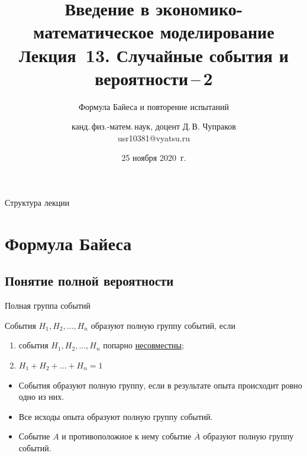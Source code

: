 \documentclass[unicode,11pt,notheorems,xcolor=table]{beamer}
\author[Д.\,В. Чупраков]{канд.\,физ.-матем.\,наук, доцент Д.\,В. Чупраков\\[6pt] usr10381@vyatsu.ru}
\institute[ВятГУ]{ФГБОУ ВО Вятский государственный университет}
\title[Лекция~13. Случайные события и вероятности]{
	Введение в экономико-математическое моделирование\\[12pt]
	Лекция~13. Случайные события и вероятности\,--\,2}
\subtitle{Формула Байеса и повторение испытаний}
\date{25 ноября 2020~г.}
\begin{document}
\maketitle

\begin{frame}{Структура лекции}
	\tableofcontents
\end{frame}

\section{Формула Байеса}

\subsection{Понятие полной вероятности}
\begin{frame}{Полная группа событий}{}
    \begin{block}{}
        События $H_1, H_2,\ldots, H_n$ образуют \alert{полную группу событий}, если 
        \begin{enumerate}
            \item события \alert{$H_1, H_2,\ldots, H_n$} попарно \underline{несовместны};
            \item \alert{$H_1+H_2+\ldots+H_n = 1$}
        \end{enumerate}
    \end{block}

    \bigskip
    \begin{itemize}
        \item События образуют полную группу, если в результате опыта происходит ровно одно из них.
        \item Все исходы опыта образуют полную группу событий.
        \item Событие $A$ и противоположное к нему событие $\overline{A}$ образуют полную группу событий.
    \end{itemize}
\end{frame}
\end{document}
